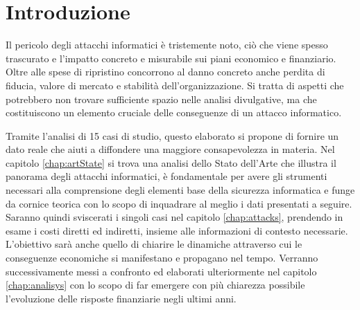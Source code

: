\documentclass[12pt,a4paper,twoside]{report}
\begin{document}
\chapter{Introduzione} 
\lhead[\fancyplain{}{\bfseries\thepage}]{\fancyplain{}{\bfseries\rightmark}}


Il pericolo degli attacchi informatici \`e tristemente noto, ci\`o che viene
spesso trascurato e l'impatto concreto e misurabile sui piani economico e finanziario. 
Oltre alle spese di ripristino concorrono al danno concreto anche perdita di fiducia, valore di mercato e stabilit\`a dell'organizzazione. 
Si tratta di aspetti che potrebbero non trovare sufficiente spazio nelle analisi divulgative, ma che
costituiscono un elemento cruciale delle conseguenze di un attacco informatico.


Tramite l'analisi di 15 casi di studio, questo elaborato si propone di fornire un dato reale che aiuti a diffondere una 
maggiore consapevolezza in materia. Nel capitolo \ref{chap:artState} si trova una analisi dello Stato dell'Arte che
illustra il panorama degli attacchi informatici, \`e fondamentale per avere gli strumenti necessari alla comprensione degli elementi base
della sicurezza informatica e funge da cornice teorica con lo scopo di inquadrare al meglio i dati presentati a seguire. Saranno quindi sviscerati i singoli casi nel capitolo \ref{chap:attacks}, prendendo in esame
i costi diretti ed indiretti, insieme alle informazioni di contesto necessarie. 
L'obiettivo sar\`a anche quello  di chiarire le dinamiche attraverso cui le conseguenze economiche si manifestano e 
propagano nel tempo. Verranno successivamente messi  a confronto ed elaborati ulteriormente nel capitolo \ref{chap:analisys} con lo scopo di 
far emergere con pi\`u chiarezza possibile l'evoluzione delle risposte finanziarie negli ultimi anni. 
\newpage


\end{document}

